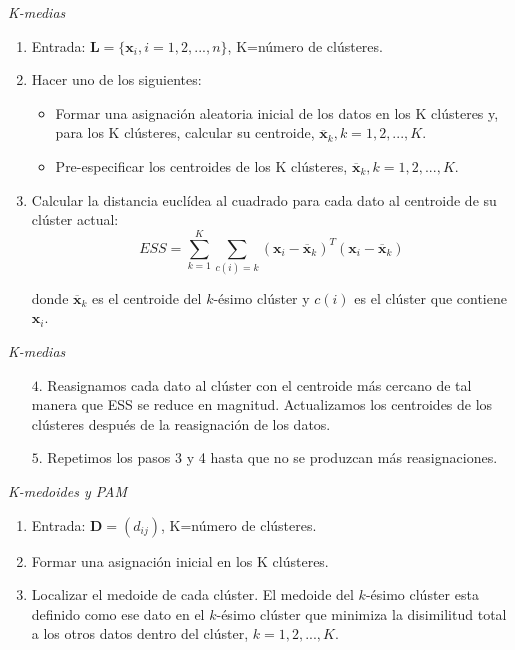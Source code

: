 \documentclass[spanish]{beamer}
\begin{document}
\begin{frame}{\textit{K-medias}}
\begin{enumerate}
\item Entrada: $\textbf{L}=\{\textbf{x}_i,i=1,2,...,n\}$, K=número de clústeres.

\item Hacer uno de los siguientes:
\begin{itemize}
\item Formar una asignación aleatoria inicial de los datos en los K clústeres y, para los K clústeres, calcular su centroide, $\overline{\textbf{x}}_k, k=1,2,...,K$.
\item Pre-especificar los centroides de los K clústeres, $\overline{\textbf{x}}_k, k=1,2,...,K$.
\end{itemize}
\item Calcular la distancia euclídea al cuadrado para cada dato al centroide de su clúster actual:
$$ESS=\sum_{k=1}^{K}\sum_{c(i)=k}(\textbf{x}_i - \overline{\textbf{x}}_k)^T(\textbf{x}_i - \overline{\textbf{x}}_k)$$

donde $\overline{\textbf{x}}_k$ es el centroide del $k$-ésimo clúster y $c(i)$ es el clúster que contiene $\textbf{x}_i$.

\end{enumerate}
\end{frame}


\begin{frame}{\textit{K-medias}}
\begin{enumerate}

\item[$4.$] Reasignamos cada dato al clúster con el centroide más cercano de tal manera que ESS se reduce en magnitud. Actualizamos los centroides de los clústeres después de la reasignación de los datos. 
\item[$5.$] Repetimos los pasos 3 y 4 hasta que no se produzcan más reasignaciones.
\end{enumerate}

\end{frame}



\begin{frame}{\textit{K-medoides y PAM}}
\begin{enumerate}
\item Entrada: $\textbf{D}=(d_{ij})$, K=número de clústeres.
\item Formar una asignación inicial en los K clústeres.
\item Localizar el medoide de cada clúster. El medoide del $k$-ésimo clúster esta definido como ese dato en el $k$-ésimo clúster que minimiza la disimilitud total a los otros datos dentro del clúster, $k=1,2,...,K$.



\end{enumerate}

\end{frame}
\end{document}
